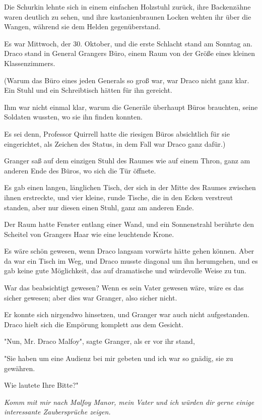 {Die Schurkin lehnte sich in einem einfachen Holzstuhl zurück, ihre Backenzähne waren deutlich zu sehen, und ihre kastanienbraunen Locken wehten ihr über die Wangen, während sie dem Helden gegenüberstand.

Es war Mittwoch, der 30. Oktober, und die erste Schlacht stand am Sonntag an. Draco stand in General Grangers Büro, einem Raum von der Größe eines kleinen Klassenzimmers.

(Warum das Büro eines jeden Generals so groß war, war Draco nicht ganz klar. Ein Stuhl und ein Schreibtisch hätten für ihn gereicht.

Ihm war nicht einmal klar, warum die Generäle überhaupt Büros brauchten, seine Soldaten wussten, wo sie ihn finden konnten.

Es sei denn, Professor Quirrell hatte die riesigen Büros absichtlich für sie eingerichtet, als Zeichen des Status, in dem Fall war Draco ganz dafür.)

Granger saß auf dem einzigen Stuhl des Raumes wie auf einem Thron, ganz am anderen Ende des Büros, wo sich die Tür öffnete.

Es gab einen langen, länglichen Tisch, der sich in der Mitte des Raumes zwischen ihnen erstreckte, und vier kleine, runde Tische, die in den Ecken verstreut standen, aber nur diesen einen Stuhl, ganz am anderen Ende.

Der Raum hatte Fenster entlang einer Wand, und ein Sonnenstrahl berührte den Scheitel von Grangers Haar wie eine leuchtende Krone.

Es wäre schön gewesen, wenn Draco langsam vorwärts hätte gehen können. Aber da war ein Tisch im Weg, und Draco musste diagonal um ihn herumgehen, und es gab keine gute Möglichkeit, das auf dramatische und würdevolle Weise zu tun.

War das beabsichtigt gewesen? Wenn es sein Vater gewesen wäre, wäre es das sicher gewesen; aber dies war Granger, also sicher nicht.

Er konnte sich nirgendwo hinsetzen, und Granger war auch nicht aufgestanden. Draco hielt sich die Empörung komplett aus dem Gesicht.

"Nun, Mr. Draco Malfoy", sagte Granger, als er vor ihr stand,

"Sie haben um eine Audienz bei mir gebeten und ich war so gnädig, sie zu gewähren.

Wie lautete Ihre Bitte?"

\emph{Komm mit mir nach Malfoy Manor, mein Vater und ich würden dir gerne einige interessante Zaubersprüche zeigen.}

}

